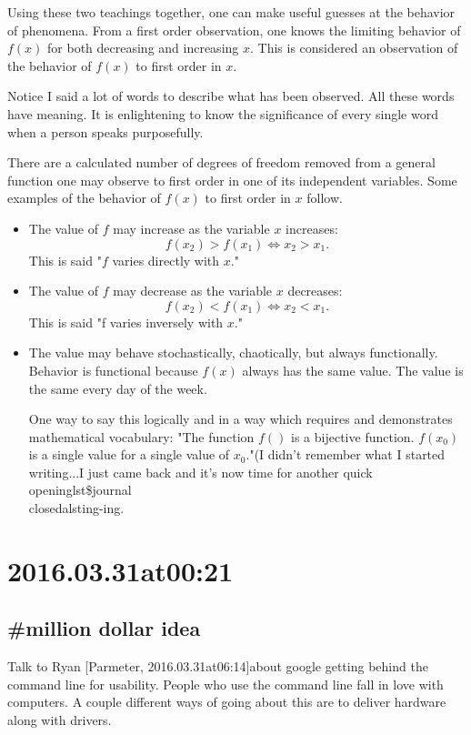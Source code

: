 Using these two teachings together, one can make useful guesses at the behavior of phenomena. From a first order observation, one knows the limiting behavior of $f(x)$ for both decreasing and increasing $x$. This is considered an observation of the behavior of $f(x)$ to first order in $x$.

Notice I said a lot of words to describe what has been observed. All these words have meaning. It is enlightening to know the significance of every single word when a person speaks purposefully.

There are a calculated number of degrees of freedom removed from a general function one may observe to first order in one of its independent variables. Some examples of the behavior of $f(x)$ to first order in $x$ follow.

\begin{itemize}
\item The value of $f$ may increase as the variable $x$ increases:$$f(x_2) > f(x_1) \Leftrightarrow x_2 > x_1.$$ This is said "$f$ varies directly with $x$."
\item The value of $f$ may decrease as the variable $x$ decreases:$$f(x_2) < f(x_1) \Leftrightarrow x_2 < x_1.$$ This is said "f varies inversely with $x$."
\item The value may behave stochastically, chaotically, but always functionally. Behavior is functional because $f(x)$ always has the same value. The value is the same every day of the week.

One way to say this logically and in a way which requires and demonstrates mathematical vocabulary:
"The function $f()$ is a bijective function. $f(x_0)$ is a single value for a single value of $x_0$."(I didn't remember what I started writing...I just came back and it's now time for another quick \\openinglst\$journal\\closedalsting-ing.
\end{itemize}

\section*{ 2016.03.31at00:21 }
\subsection*{\#{million dollar idea}}
Talk to Ryan [Parmeter, 2016.03.31at06:14]about google getting behind the command line for usability. People who use the command line fall in love with computers. A couple different ways of going about this are to deliver hardware along with drivers.

